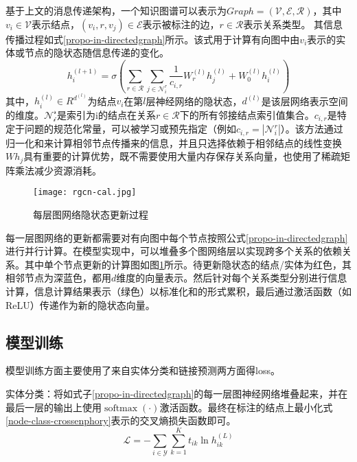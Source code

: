 基于上文的消息传递架构，一个知识图谱可以表示为$Graph=\left(\mathcal{V},\mathcal{E},\mathcal{R}\right)$，其中$v_i\in\mathcal{V}$表示结点，$\left(v_i,r,v_j\right)\in\mathcal{E}$表示被标注的边，$r\in\mathcal{R}$表示关系类型。
其信息传播过程如式\ref{propo-in-directedgraph}所示。该式用于计算有向图中由$v_{i}$表示的实体或节点的隐状态随信息传递的变化。
\begin{equation}
    h_{i}^{(l+1)}=\sigma\left(\sum_{r \in \mathcal{R}} \sum_{j \in \mathcal{N}_{i}^{r}} \frac{1}{c_{i, r}} W_{r}^{(l)} h_{j}^{(l)}+W_{0}^{(l)} h_{i}^{(l)}\right)
    \label{propo-in-directedgraph}
\end{equation}
其中，$h_i^{\left(l\right)}\in R^{d^{\left(l\right)}}$为结点$v_i$在第$l$层神经网络的隐状态，$d^{\left(l\right)}$是该层网络表示空间的维度。$\mathcal{N}_\mathcal{i}^\mathcal{r}$是索引为i的结点在关系$r\in\mathcal{R}$下的所有邻接结点索引值集合。$c_{i,r}$是特定于问题的规范化常量，可以被学习或预先指定（例如$c_{i, r}=\left|\mathcal{N}_{i}^{r}\right|$）。该方法通过归一化和来计算相邻节点传播来的信息，并且只选择依赖于相邻结点的线性变换$Wh_j$具有重要的计算优势，既不需要使用大量内存保存关系向量，也使用了稀疏矩阵乘法减少资源消耗。

\begin{figure}[htbp]
    \centering
    \texttt{[image: rgcn-cal.jpg]}
    \caption{每层图网络隐状态更新过程\label{rgcn-cal}}
\end{figure}

每一层图网络的更新都需要对有向图中每个节点按照公式\ref{propo-in-directedgraph}进行并行计算。在模型实现中，可以堆叠多个图网络层以实现跨多个关系的依赖关系。其中单个节点更新的计算图如图\ref{rgcn-cal}所示。待更新隐状态的结点/实体为红色，其相邻节点为深蓝色，都用$d$维度的向量表示。然后针对每个关系类型分别进行信息计算，信息计算结果表示（绿色）以标准化和的形式累积，最后通过激活函数（如ReLU）传递作为新的隐状态向量。

\subsection{模型训练}
模型训练方面主要使用了来自实体分类和链接预测两方面得loss。

实体分类：将如式子\ref{propo-in-directedgraph}的每一层图神经网络堆叠起来，并在最后一层的输出上使用$\operatorname{softmax}(\cdot)$激活函数。最终在标注的结点上最小化式\ref{node-class-crossenphory}表示的交叉熵损失函数即可。
\begin{equation}
    \mathcal{L}=-\sum_{i \in \mathcal{Y}} \sum_{k=1}^{K} t_{i k} \ln h_{i k}^{(L)}
    \label{node-class-crossenphory}
\end{equation}

